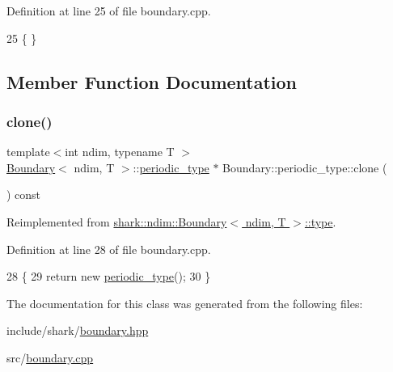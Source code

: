 Definition at line 25 of file boundary.\+cpp.


\begin{DoxyCode}
25 \{ \}
\end{DoxyCode}


\subsection{Member Function Documentation}
\hypertarget{classshark_1_1ndim_1_1_boundary_1_1periodic__type_a54904c3d305d26abe8cc8f4b85d9d7e0}{}\label{classshark_1_1ndim_1_1_boundary_1_1periodic__type_a54904c3d305d26abe8cc8f4b85d9d7e0} 
\subsubsection{\texorpdfstring{clone()}{clone()}}
{\footnotesize\ttfamily template$<$int ndim, typename T $>$ \\
\hyperlink{classshark_1_1ndim_1_1_boundary}{Boundary}$<$ ndim, T $>$\+::\hyperlink{classshark_1_1ndim_1_1_boundary_1_1periodic__type}{periodic\+\_\+type} $\ast$ Boundary\+::periodic\+\_\+type\+::clone (\begin{DoxyParamCaption}{ }\end{DoxyParamCaption}) const\hspace{0.3cm}{\ttfamily [virtual]}}



Reimplemented from \hyperlink{classshark_1_1ndim_1_1_boundary_1_1type_a5651988ce3a6c229009d3fa849e820dc}{shark\+::ndim\+::\+Boundary$<$ ndim, T $>$\+::type}.



Definition at line 28 of file boundary.\+cpp.


\begin{DoxyCode}
28                                                                                    \{
29     \textcolor{keywordflow}{return} \textcolor{keyword}{new} \hyperlink{classshark_1_1ndim_1_1_boundary_1_1periodic__type_a2a2361be7dd3d056049d46160c7dbafa}{periodic\_type}();
30 \}
\end{DoxyCode}


The documentation for this class was generated from the following files\+:\begin{DoxyCompactItemize}
\item 
include/shark/\hyperlink{boundary_8hpp}{boundary.\+hpp}\item 
src/\hyperlink{boundary_8cpp}{boundary.\+cpp}\end{DoxyCompactItemize}

